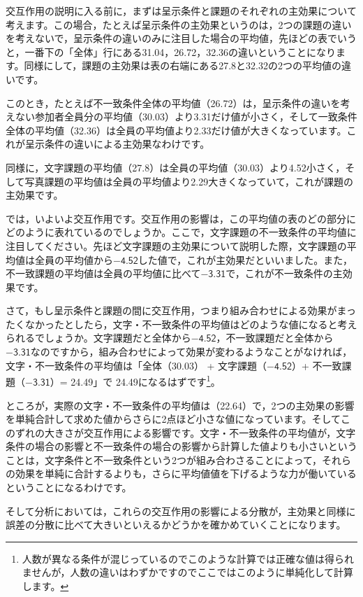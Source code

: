 \documentclass[
  12pt,
  a5jpaper,
  lualatex, ja=standard]{bxjsbook}
\begin{document}
交互作用の説明に入る前に，まずは呈示条件と課題のそれぞれの主効果について考えます。この場合，たとえば呈示条件の主効果というのは，2つの課題の違いを考えないで，呈示条件の違いのみに注目した場合の平均値，先ほどの表でいうと，一番下の「全体」行にある31.04，26.72，32.36の違いということになります。同様にして，課題の主効果は表の右端にある27.8と32.32の2つの平均値の違いです。

このとき，たとえば不一致条件全体の平均値（26.72）は，呈示条件の違いを考えない参加者全員分の平均値（30.03）より3.31だけ値が小さく，そして一致条件全体の平均値（32.36）は全員の平均値より2.33だけ値が大きくなっています。これが呈示条件の違いによる主効果なわけです。

同様に，文字課題の平均値（27.8）は全員の平均値（30.03）より4.52小さく，そして写真課題の平均値は全員の平均値より2.29大きくなっていて，これが課題の主効果です。

では，いよいよ交互作用です。交互作用の影響は，この平均値の表のどの部分にどのように表れているのでしょうか。ここで，文字課題の不一致条件の平均値に注目してください。先ほど文字課題の主効果について説明した際，文字課題の平均値は全員の平均値から\(-\textsf{4.52}\)した値で，これが主効果だといいました。また，不一致課題の平均値は全員の平均値に比べて\(-\textsf{3.31}\)で，これが不一致条件の主効果です。

さて，もし呈示条件と課題の間に交互作用，つまり組み合わせによる効果がまったくなかったとしたら，文字・不一致条件の平均値はどのような値になると考えられるでしょうか。文字課題だと全体から\(-\textsf{4.52}\)，不一致課題だと全体から\(-\textsf{3.31}\)なのですから，組み合わせによって効果が変わるようなことがなければ，文字・不一致条件の平均値は「全体（30.03） + 文字課題（\(-\textsf{4.52}\)）+ 不一致課題（\(-\textsf{3.31}\)）= 24.49」で 24.49になるはずです\footnote{人数が異なる条件が混じっているのでこのような計算では正確な値は得られませんが，人数の違いはわずかですのでここではこのように単純化して計算します。}。

ところが，実際の文字・不一致条件の平均値は（22.64）で，2つの主効果の影響を単純合計して求めた値からさらに2点ほど小さな値になっています。そしてこのずれの大きさが交互作用による影響です。文字・不一致条件の平均値が，文字条件の場合の影響と不一致条件の場合の影響から計算した値よりも小さいということは，文字条件と不一致条件という2つが組み合わさることによって，それらの効果を単純に合計するよりも，さらに平均値値を下げるような力が働いているということになるわけです。

そして分析においては，これらの交互作用の影響による分散が，主効果と同様に誤差の分散に比べて大きいといえるかどうかを確かめていくことになります。
\end{document}
